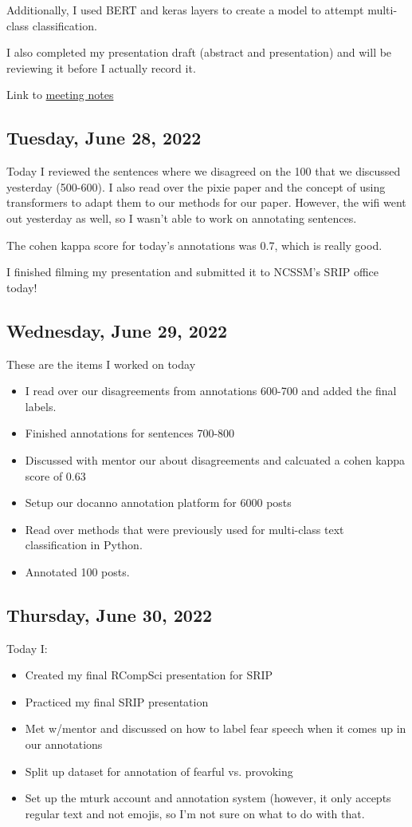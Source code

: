 \documentclass[11pt,letterpaper]{article}
\begin{document}
Additionally, I used BERT and keras layers to create a model to attempt multi-class classification.

I also completed my presentation draft (abstract and presentation) and will be reviewing it before I actually record it.

Link to \href{https://docs.google.com/document/d/1yPdZDb-eeijU4GWeDnLeWesqKLKzm0n0pdUh024UHcc/edit?usp=sharing}{meeting notes}

\subsection{Tuesday, June 28, 2022}
Today I reviewed the sentences where we disagreed on the 100 that we discussed yesterday (500-600). I also read over the pixie paper and the concept of using transformers to adapt them to our methods for our paper.
However, the wifi went out yesterday as well, so I wasn't able to work on annotating sentences.


The cohen kappa score for today's annotations was 0.7, which is really good.

I finished filming my presentation and submitted it to NCSSM's SRIP office today!

\subsection{Wednesday, June 29, 2022}
These are the items I worked on today
\begin{itemize}
    \item I read over our disagreements from annotations 600-700 and added the final labels.
    \item Finished annotations for sentences 700-800
    \item Discussed with mentor our about disagreements and calcuated a cohen kappa score of 0.63
    \item Setup our docanno annotation platform for 6000 posts
    \item Read over methods that were previously used for multi-class text classification in Python.
    \item Annotated 100 posts.
\end{itemize}

\subsection{Thursday, June 30, 2022}
Today I:
\begin{itemize}
    \item Created my final RCompSci presentation for SRIP
    \item Practiced my final SRIP presentation
    \item Met w/mentor and discussed on how to label fear speech when it comes up in our annotations
    \item Split up dataset for annotation of fearful vs. provoking
    \item Set up the mturk account and annotation system (however, it only accepts regular text and not emojis, so I'm not sure on what to do with that.
\end{itemize}
\end{document}
